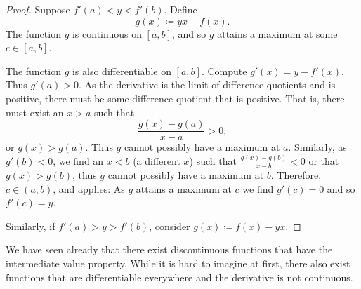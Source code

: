 \begin{proof}
Suppose 
$f'(a) < y < f'(b)$.
Define
\begin{equation*}
g(x) \coloneqq yx - f(x) .
\end{equation*}
The function $g$ is continuous on $[a,b]$, and so $g$ attains a maximum at some $c \in
[a,b]$.

The function $g$ is also differentiable on $[a,b]$.
Compute $g'(x) = y-f'(x)$.  Thus $g'(a) > 0$.  As the derivative is
the limit of difference quotients and is positive, there must be some
difference quotient that is positive.  That is, there must exist
an $x > a$ such that
\begin{equation*}
\frac{g(x)-g(a)}{x-a} > 0 ,
\end{equation*}
or $g(x) > g(a)$.  Thus $g$
cannot possibly have a maximum at $a$.  Similarly, as $g'(b) < 0$,
we find an $x < b$ (a different $x$) such that
$\frac{g(x)-g(b)}{x-b} < 0$ or that $g(x) > g(b)$, thus
$g$ cannot possibly have a maximum at $b$.
Therefore, $c \in (a,b)$,
and  applies: As $g$ attains a maximum
at $c$ we find $g'(c) = 0$
and so $f'(c) = y$.

Similarly, if $f'(a) > y > f'(b)$, consider $g(x) \coloneqq f(x)- yx$.
\end{proof}

We have seen already that
there exist discontinuous functions that have the
intermediate value property.  While it is hard to imagine at first, there
also
exist functions that are differentiable everywhere and the derivative is not
continuous.

